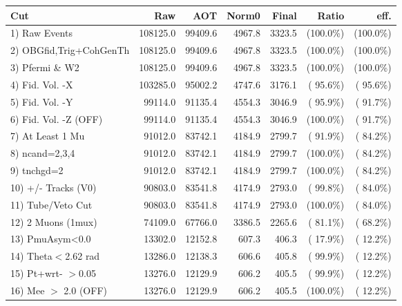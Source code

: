  \begin{table}[h!]\centering
 \begin{tabular}{||l||r|r|r|r|r|r||}
 \hline
 \hline
 Cut & Raw & AOT & Norm0 & Final & Ratio & eff.       \\
 \hline
  1) Raw Events           &     108125.0 &      99409.6 &       4967.8 &       3323.5 & (100.0\%) & (100.0\%) \\
  2) OBGfid,Trig+CohGenTh &     108125.0 &      99409.6 &       4967.8 &       3323.5 & (100.0\%) & (100.0\%) \\
  3) Pfermi \& W2         &     108125.0 &      99409.6 &       4967.8 &       3323.5 & (100.0\%) & (100.0\%) \\
  4) Fid. Vol. -X         &     103285.0 &      95002.2 &       4747.6 &       3176.1 & ( 95.6\%) & ( 95.6\%) \\
  5) Fid. Vol. -Y         &      99114.0 &      91135.4 &       4554.3 &       3046.9 & ( 95.9\%) & ( 91.7\%) \\
  6) Fid. Vol. -Z (OFF)   &      99114.0 &      91135.4 &       4554.3 &       3046.9 & (100.0\%) & ( 91.7\%) \\
  7) At Least 1 Mu        &      91012.0 &      83742.1 &       4184.9 &       2799.7 & ( 91.9\%) & ( 84.2\%) \\
  8) ncand=2,3,4          &      91012.0 &      83742.1 &       4184.9 &       2799.7 & (100.0\%) & ( 84.2\%) \\
  9) tnchgd=2             &      91012.0 &      83742.1 &       4184.9 &       2799.7 & (100.0\%) & ( 84.2\%) \\
 10) +/- Tracks (V0)      &      90803.0 &      83541.8 &       4174.9 &       2793.0 & ( 99.8\%) & ( 84.0\%) \\
 11) Tube/Veto Cut        &      90803.0 &      83541.8 &       4174.9 &       2793.0 & (100.0\%) & ( 84.0\%) \\
 12) 2 Muons (1mux)       &      74109.0 &      67766.0 &       3386.5 &       2265.6 & ( 81.1\%) & ( 68.2\%) \\
 13) PmuAsym<0.0          &      13302.0 &      12152.8 &        607.3 &        406.3 & ( 17.9\%) & ( 12.2\%) \\
 14) Theta$<$2.62 rad     &      13286.0 &      12138.3 &        606.6 &        405.8 & ( 99.9\%) & ( 12.2\%) \\
 15) Pt+wrt- $>$0.05      &      13276.0 &      12129.9 &        606.2 &        405.5 & ( 99.9\%) & ( 12.2\%) \\
 16) Mee $>$ 2.0  (OFF)   &      13276.0 &      12129.9 &        606.2 &        405.5 & (100.0\%) & ( 12.2\%) \\

\end{tabular}
\end{table}
